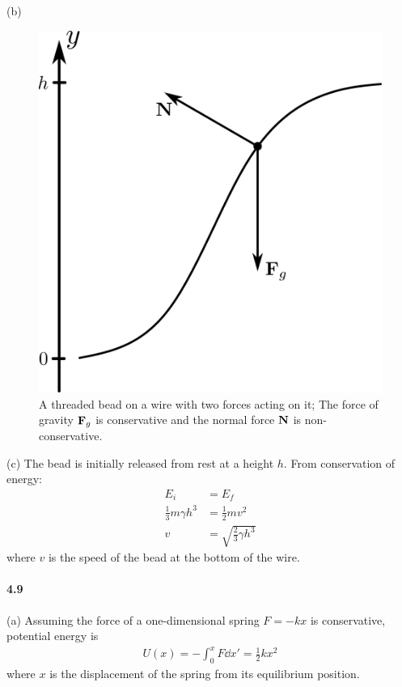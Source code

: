 \documentclass[../problems.tex]{subfiles}
\begin{document}
(b)
\begin{figure}[ht]
    \centering
    \includegraphics[scale=0.7]{../images/fig4_7.png}
    \caption{A threaded bead on a wire with two forces acting on it; The force of gravity $\vb{F}_g$
    is conservative and the normal force $\vb{N}$ is non-conservative.}
    \label{fig:4_7}
\end{figure}

(c) The bead is initially released from rest at a height $h$. From conservation of energy:
\begin{align}
    E_i &= E_f \\
    \frac{1}{3} m\gamma h^3 &= \frac{1}{2} m v^2 \\
    v &= \sqrt{\frac{2}{3} \gamma h^3}
\end{align}
where $v$ is the speed of the bead at the bottom of the wire.

\paragraph{4.9}
(a) Assuming the force of a one-dimensional spring $F = -kx$ is conservative, potential energy is
\begin{align*}
    U(x) = - \int_0^x F \dd{x'} = \frac{1}{2} kx^2  
\end{align*}
where $x$ is the displacement of the spring from its equilibrium position.
\end{document}
